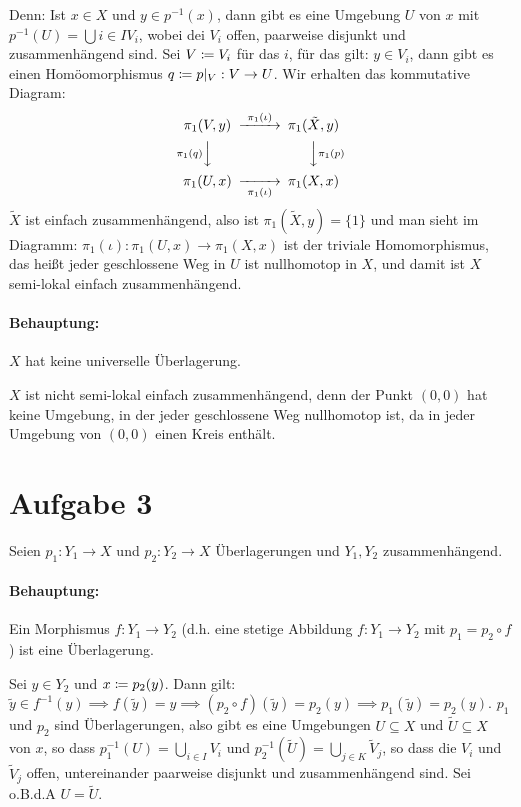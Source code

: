 \documentclass{article}
\begin{document}
Denn: Ist $x\in X$ und $y\in p^{-1}(x)$, dann gibt es eine Umgebung $U$ von $x$ mit $p^{-1}(U)=\bigcup{i\in I} V_i$, wobei dei $V_i$ offen, paarweise disjunkt und zusammenhängend sind. Sei $V\mathrel{\mbox{$\coloneqq$}} V_i$ für das $i$, für das gilt: $y\in V_i$, dann gibt es einen Homöomorphismus $q\mathrel{\mbox{$\coloneqq$}} p|_V :V\to U$. Wir erhalten das kommutative Diagram:
\[
\begin{CD}
\pi_1(V,y) @>\pi_1(\iota)>> \pi_1(\tilde X, y) \\
@V\pi_1(q)VV @VV\pi_1(p)V \\
\pi_1(U,x) @>>\pi_1(\iota)> \pi_1(X,x) \\
\end{CD}
\]
$\tilde X$ ist einfach zusammenhängend, also ist $\pi_1(\tilde X,y)=\{1\}$ und man sieht im Diagramm: $\pi_1(\iota): \pi_1(U,x)\to\pi_1(X,x)$ ist der triviale Homomorphismus, das heißt jeder geschlossene Weg in $U$ ist nullhomotop in $X$, und damit ist $X$ semi-lokal einfach zusammenhängend. 


\paragraph{Behauptung:} $X$ hat keine universelle Überlagerung.

$X$ ist nicht semi-lokal einfach zusammenhängend, denn der Punkt $(0,0)$ hat keine Umgebung, in der jeder geschlossene Weg nullhomotop ist, da in jeder Umgebung von $(0,0)$ einen Kreis enthält.


\section*{Aufgabe 3}

Seien $p_1:Y_1\to X$ und $p_2:Y_2\to X$ Überlagerungen und $Y_1,Y_2$ zusammenhängend.

\paragraph{Behauptung:} Ein Morphismus $f:Y_1\to Y_2$ (d.h. eine stetige Abbildung $f:Y_1\to Y_2$ mit $p_1=p_2\circ f$) ist eine Überlagerung.

Sei $y\in Y_2$ und $x\mathrel{\mbox{$\coloneqq$}} p_2(y)$. Dann gilt: $\tilde y\in f^{-1}(y)\implies f(\tilde y)=y \implies (p_2\circ f)(\tilde y) = p_2(y) \implies p_1(\tilde y) = p_2(y)$. $p_1$ und $p_2$ sind Überlagerungen, also gibt es eine Umgebungen $U\subseteq X$ und $\tilde U\subseteq X$ von $x$, so dass $p_1^{-1}(U)=\bigcup_{i\in I}V_i$ und $p_2^{-1}(\tilde U) = \bigcup_{j\in K}\tilde V_j$, so dass die $V_i$ und $\tilde V_j$ offen, untereinander paarweise disjunkt und zusammenhängend sind. Sei o.B.d.A $U=\tilde U$.
\end{document}

